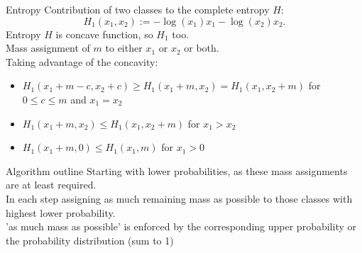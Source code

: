 \documentclass{beamer}
\theoremstyle{definition} \newtheorem{llemma}{Lemma}
\begin{document}
\begin{frame}{Entropy}
Contribution of two classes to the complete entropy $H$:\\
\begin{displaymath}
H_1(x_1,x_2) := -\log(x_1)x_1 - \log(x_2)x_2.
\end{displaymath}
Entropy $H$ is concave function, so $H_1$ too.\\[0.6em]
Mass assignment of $m$ to either $x_1$ or $x_2$ or both.\\[0.6em]
Taking advantage of the concavity:
\begin{itemize}
\item $H_1(x_1 + m-c, x_2+c) \geq H_1(x_1+m, x_2) = H_1(x_1,x_2+m)$ for $0\leq c \leq m$ and $x_1 = x_2$\\
\item $H_1(x_1 + m, x_2) \leq H_1(x_1,x_2 + m)$ for $x_1 > x_2$\\
\item $H_1(x_1 + m, 0) \leq H_1(x_1,m)$ for $x_1 > 0$\\
\end{itemize}
\end{frame}

\begin{frame}{Algorithm outline}
Starting with lower probabilities, as these mass assignments are at least required.\\[0.6em]
In each step assigning as much remaining mass as possible to those classes with highest lower probability.\\[0.6em]
'as much mass as possible' is enforced by the corresponding upper probability or the probability distribution (sum to 1) 
\end{frame}
\end{document}
